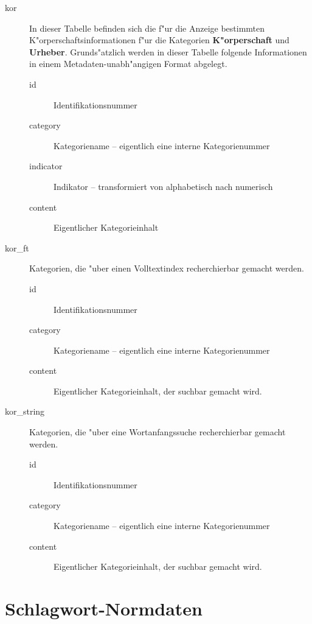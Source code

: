 \documentclass[11pt, twoside, a4paper, BCOR8mm, DIV12, bibtotoc,idxtotoc]{scrbook}
\begin{document}
\begin{itemize}
\begin{description}
\item[kor] In dieser Tabelle befinden sich die f"ur die Anzeige
  bestimmten K"orperschaftsinformationen f"ur die Kategorien
  \textbf{K"orperschaft} und \textbf{Urheber}. Grunds"atzlich werden in
  dieser Tabelle folgende Informationen in einem
  Metadaten-unabh"angigen Format abgelegt.
  \begin{description}
  \item[id] Identifikationsnummer
  \item[category] Kategoriename -- eigentlich eine interne Kategorienummer
  \item[indicator] Indikator -- transformiert von alphabetisch nach numerisch
  \item[content] Eigentlicher Kategorieinhalt
  \end{description}
\item[kor\_ft] Kategorien, die "uber einen Volltextindex recherchierbar
  gemacht werden.
  \begin{description}
  \item[id] Identifikationsnummer
  \item[category] Kategoriename -- eigentlich eine interne Kategorienummer
  \item[content] Eigentlicher Kategorieinhalt, der suchbar gemacht wird.
  \end{description}
\item[kor\_string] Kategorien, die "uber eine Wortanfangssuche
  recherchierbar gemacht werden.
  \begin{description}
  \item[id] Identifikationsnummer
  \item[category] Kategoriename -- eigentlich eine interne Kategorienummer
  \item[content] Eigentlicher Kategorieinhalt, der suchbar gemacht wird.
  \end{description}
\end{description}

\section{Schlagwort-Normdaten}


\end{itemize}
\end{document}
